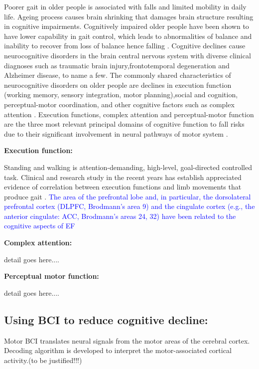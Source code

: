 \documentclass[conference,compsoc]{IEEEtran}
\begin{document}
Poorer gait in older people is associated with falls and limited mobility in daily life. Ageing process causes brain shrinking that damages brain structure resulting in cognitive impairments. Cognitively impaired older people have been shown to have lower capability in gait control, which leads to abnormalities of balance and inability to recover from loss of balance \cite{Thelen_1997} hence falling \cite{Martin_2012, Carty_2014}. Cognitive declines cause neurocognitive disorders in the brain central nervous system with diverse clinical diagnoses such as traumatic brain injury,frontotemporal degeneration and Alzheimer disease, to name a few. The commonly shared characteristics of neurocognitive disorders on older people are declines in execution function (working memory,  sensory integration, motor planning),social and cognition, perceptual-motor coordination, and other cognitive factors such as complex attention \cite{Sachdev_2014}. Execution functions, complex attention and perceptual-motor function are the three most relevant principal domains of cognitive function to fall risks due to their significant involvement in neural pathways of motor system \cite{Zhang_2019}. 

\textbf{Execution function:}

Standing and walking is attention-demanding, high-level, goal-directed controlled task. Clinical and research study in the recent years has establish appreciated evidence of correlation between execution functions and limb movements that produce gait \cite{Yogev_Seligmann_2007}.
\textcolor{blue}{The area of the prefrontal
lobe and, in particular, the dorsolateral prefrontal cortex
(DLPFC, Brodmann’s area 9) and the cingulate cortex
(e.g., the anterior cingulate: ACC, Brodmann’s areas 24,
32) have been related to the cognitive aspects of EF \cite{Yogev_Seligmann_2007}}

\textbf{Complex attention:}

detail goes here....

\textbf{Perceptual motor function:}

detail goes here....

\subsection{Using BCI to reduce cognitive decline:}

Motor BCI translates neural signals from the motor areas of the cerebral cortex. Decoding algorithm is developed to interpret the motor-associated cortical activity.(to be justified!!!)
\end{document}
